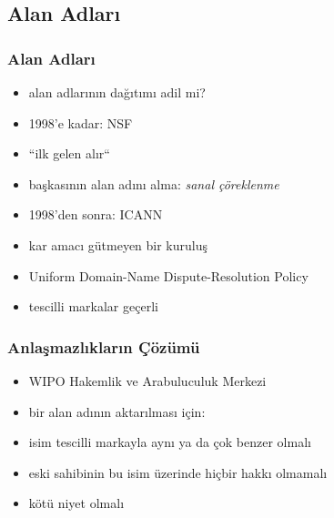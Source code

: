 \documentclass[dvipsnames]{beamer}
\theoremstyle{plain}
\begin{document}
\subsection{Alan Adları}

\begin{frame}
  \frametitle{Alan Adları}

  \begin{itemize}
    \item alan adlarının dağıtımı adil mi?

    \bigskip
    \item 1998'e kadar: NSF
    \item ``ilk gelen alır``
    \item başkasının alan adını alma: \emph{sanal çöreklenme}

    \pause
    \medskip
    \item 1998'den sonra: ICANN
    \item kar amacı gütmeyen bir kuruluş
    \item Uniform Domain-Name Dispute-Resolution Policy
    \item tescilli markalar geçerli
  \end{itemize}
\end{frame}

\begin{frame}
  \frametitle{Anlaşmazlıkların Çözümü}

  \begin{itemize}
    \item WIPO Hakemlik ve Arabuluculuk Merkezi

    \bigskip
    \item bir alan adının aktarılması için:
    \smallskip
    \item isim tescilli markayla aynı ya da çok benzer olmalı
    \item eski sahibinin bu isim üzerinde hiçbir hakkı olmamalı
    \item kötü niyet olmalı
  \end{itemize}
\end{frame}
\end{document}
